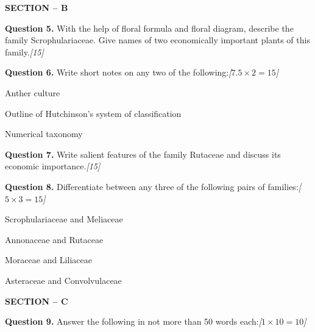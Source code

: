 \documentclass[11pt,a4paper]{article}
\newcommand{\pts}[1]{\hfill   \textit{[#1]}}
\begin{document}
\bigskip

\begin{center}
   \textbf{SECTION -- B}
\end{center}

\medskip


\noindent   \textbf{Question 5.} With the help of floral formula and floral diagram, describe the family Scrophulariaceae. Give names of two economically important plants of this family.\pts{15}

\medskip


\noindent   \textbf{Question 6.} Write short notes on any two of the following:\pts{$7.5  \times 2 = 15$}

\begin{parts}
  \item Anther culture
  \item Outline of Hutchinson's system of classification
  \item Numerical taxonomy
\end{parts}

\medskip


\noindent   \textbf{Question 7.} Write salient features of the family Rutaceae and discuss its economic importance.\pts{15}

\medskip


\noindent   \textbf{Question 8.} Differentiate between any three of the following pairs of families:\pts{$5  \times 3 = 15$}

\begin{parts}
  \item Scrophulariaceae and Meliaceae
  \item Annonaceae and Rutaceae
  \item Moraceae and Liliaceae
  \item Asteraceae and Convolvulaceae
\end{parts}

\bigskip

\begin{center}
   \textbf{SECTION -- C}
\end{center}

\medskip


\noindent   \textbf{Question 9.} Answer the following in not more than 50 words each:\pts{$1  \times 10 = 10$}
\end{document}
